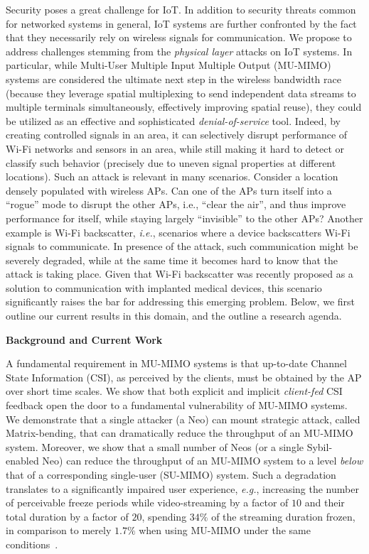 Security poses a great challenge for IoT. In addition to security threats common for networked systems in general, IoT systems are further confronted by the fact that they necessarily rely on wireless signals for communication. We propose to address challenges stemming from the \emph{physical layer} attacks on IoT systems. In particular, while Multi-User Multiple Input Multiple Output (MU-MIMO) systems are considered the ultimate next step in the wireless bandwidth race (because they leverage spatial multiplexing to send independent data streams to multiple terminals simultaneously, effectively improving spatial reuse), they could be utilized as an effective and sophisticated \emph{denial-of-service} tool. Indeed, by creating controlled signals in an area, it can selectively disrupt performance of Wi-Fi networks and sensors in an area, while still making it hard to detect or classify such behavior (precisely due to uneven signal properties at different locations). Such an attack is relevant in many scenarios. Consider a location densely populated with wireless APs. Can one of the APs turn itself into a “rogue” mode to disrupt the other APs, i.e., “clear the air”, and thus improve performance for itself, while staying largely “invisible” to the other APs? Another example is Wi-Fi backscatter, \emph{i.e.}, scenarios where a device backscatters Wi-Fi signals to communicate. In presence of the attack, such communication might be severely degraded, while at the same time it becomes hard to know that the attack is taking place. Given that Wi-Fi backscatter was recently proposed as a solution to communication with implanted medical devices, this scenario significantly raises the bar for addressing this emerging problem. Below, we first outline our current results in this domain, and the outline a research agenda.


{\bf Background and Current Work}

A fundamental requirement in MU-MIMO systems is that up-to-date Channel State Information (CSI), as perceived by the clients, must be obtained by the AP over short time scales. We show that both explicit and implicit \emph{client-fed} CSI feedback open the door to a fundamental vulnerability of MU-MIMO systems. We demonstrate that a single attacker (a Neo) can mount strategic attack, called Matrix-bending, that can dramatically reduce the throughput
of an MU-MIMO system. Moreover, we show that a small number of Neos (or a single Sybil-enabled Neo) can reduce the throughput of an MU-MIMO system to a level \emph{below} that of a corresponding single-user (SU-MIMO) system. Such a degradation translates to a significantly impaired user experience, \emph{e.g.}, increasing the number of perceivable freeze periods while video-streaming by a factor of $10$ and their total duration by a factor of $20$,
spending $34\%$ of the streaming duration frozen, in comparison to merely $1.7\%$ when using MU-MIMO under the same conditions~\cite{mu-mimoUXeffect,mimo13sigcomm}.

